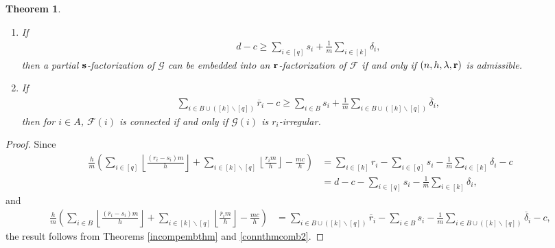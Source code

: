 \documentclass[12pt,oneside]{amsart}
\newtheorem{theorem}{Theorem}[section]
\newcommand{\cc}{\mathcal}
\newcommand\rounddown[1]{\left\lfloor#1\right\rfloor}
\begin{document}
\begin{theorem} \label{restatmenttwoconthm}
\begin{enumerate}
    \item [\textup{(a)}] If 
\begin{align*}
d-c\geq \sum_{i\in [q]} s_i +\frac{1}{m}\sum_{i\in [k]} \delta_i,
\end{align*}
then a partial $\vb{s}$-factorization of $\cc G$ can be embedded into an $\vb{r}$-factorization of $\cc F$ if and only if $(n,h,\lambda, \vb r)$ is admissible. 
\item [\textup{(b)}]  If
\begin{align*} 
    \sum_{i\in B\cup ([k] \backslash [q])} \overline{r}_i -c\geq \sum_{i\in B} s_i +\frac{1}{m}\sum_{i\in B\cup ([k] \backslash [q])} \overline{\delta}_i,
\end{align*}
then for  $i\in A$, $\cc F(i)$ is connected if and only if $\cc G(i)$ is $r_i$-irregular.
\end{enumerate}
\end{theorem}
\begin{proof}
Since
\begin{align*}
    \frac{h}{m}\left(\sum_{i\in [q]} \rounddown{\frac{(r_i-s_i)m}{h}}+\sum_{i\in [k] \backslash [q]} \rounddown{\frac{r_i m}{h}}-\frac{m c}{h} \right)&=\sum_{i\in [k]} r_i -\sum_{i\in [q]} s_i -\frac{1}{m}\sum_{i\in [k]} \delta_i-c  \\
    &= d-c-\sum_{i\in [q]} s_i -\frac{1}{m}\sum_{i\in [k]} \delta_i,
\end{align*}
and
\begin{align*}
    \frac{h}{m}\left(\sum_{i\in B} \rounddown{\frac{(\overline{r}_i-s_i)m}{h}}+\sum_{i\in [k] \backslash [q]} \rounddown{\frac{\overline{r}_im}{h}} -\frac{m c}{h} \right)&=\sum_{i\in B\cup ([k] \backslash [q])} \overline{r}_i -\sum_{i\in B} s_i -\frac{1}{m}\sum_{i\in B\cup ([k] \backslash [q])} \overline{\delta}_i-c, 
\end{align*}
the result follows from Theorems \ref{incompembthm} and \ref{connthmcomb2}.
\end{proof}
\end{document}
